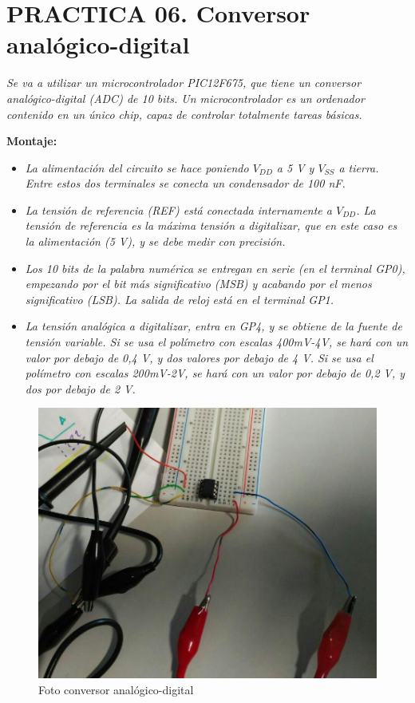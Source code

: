 \documentclass[paper=a4, fontsize=11pt]{scrartcl} %
\numberwithin{equation}{section} %
\numberwithin{figure}{section} %
\numberwithin{table}{section} %
\begin{document}
\newpage

\section{PRACTICA 06. Conversor analógico-digital \cite{RV}}

\textit{Se va a utilizar un microcontrolador PIC12F675, que tiene un conversor analógico-digital (ADC) de 10 bits. Un microcontrolador es un ordenador contenido en un único chip, capaz de controlar totalmente tareas básicas.} \newline

\textbf{Montaje:}

\begin{itemize}
	\item \textit{La alimentación del circuito se hace poniendo $ V_{DD} $ a 5 V y $ V_{SS} $ a tierra. Entre estos dos terminales se conecta un condensador de 100 nF.}
	\item \textit{La tensión de referencia (REF) está conectada internamente a $ V_{DD} $. La tensión de referencia es la máxima tensión a digitalizar, que en este caso es la alimentación (5 V), y se debe medir con precisión.}
	\item \textit{Los 10 bits de la palabra numérica se entregan en serie (en el terminal GP0), empezando por el bit más significativo (MSB) y acabando por el menos significativo (LSB). La salida de reloj está en el terminal GP1.}
	\item \textit{La tensión analógica a digitalizar, entra en GP4, y se obtiene de la fuente de tensión variable. Si se usa el polímetro con escalas 400mV-4V, se hará con un valor por debajo de 0,4 V, y dos valores por debajo de 4 V. Si se usa el polímetro con escalas 200mV-2V, se hará con un valor por debajo de 0,2 V, y dos por debajo de 2 V.}
\end{itemize}

\begin{figure}[H]
	\centering
	\includegraphics[scale=0.45]{image/prac6A}
	\caption{Foto conversor analógico-digital}
	\label{fig:prac-5a-5B}
\end{figure}
\end{document}
